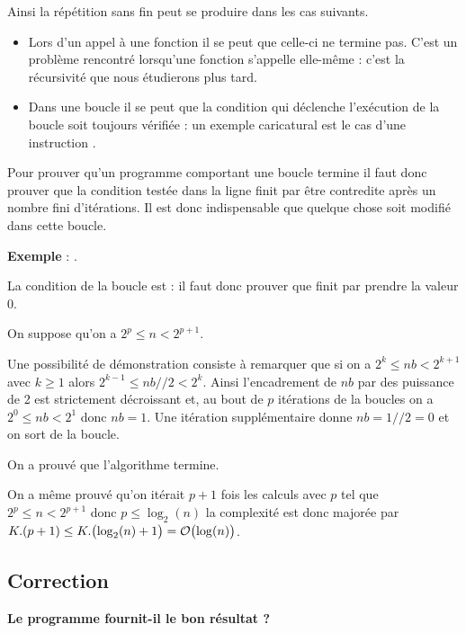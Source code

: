 Ainsi la répétition sans fin peut se produire dans les cas suivants.
\begin{itemize}
\item Lors d'un appel à une fonction il se peut que celle-ci ne termine pas. C'est un problème rencontré lorsqu'une fonction s'appelle elle-même : c'est la récursivité que nous étudierons plus tard.
\item Dans une boucle  il se peut que la condition qui déclenche l'exécution de la boucle soit toujours vérifiée : un exemple caricatural est le cas d'une instruction .
\end{itemize}
Pour prouver qu'un programme comportant une boucle  termine il faut donc prouver que la condition testée dans la ligne  finit par être contredite après un nombre fini d'itérations. Il est donc indispensable que quelque chose soit modifié dans cette boucle.

\medskip

{\bf Exemple}  : .

La condition de la boucle  est  : il faut donc prouver que  finit par prendre la valeur 0.

On suppose qu'on a $2^p \le n < 2^{p+1}$.

Une possibilité de démonstration consiste à remarquer que si on a $2^k\le nb < 2^{k+1}$ avec $k\ge 1$ alors $2^{k-1}\le nb//2 < 2^k$. Ainsi l'encadrement de $nb$ par des puissance de 2 est strictement décroissant et, au bout de $p$ itérations de la boucles on a $2^0 \le nb < 2^1$ donc $nb=1$. Une itération supplémentaire donne $nb = 1//2 = 0$ et on sort de la boucle. 

On a prouvé que l'algorithme termine.

On a même prouvé qu'on itérait $p+1$ fois les calculs avec $p$ tel que $2^p \le n < 2^{p+1}$ donc $p\le \log_2(n)$ la complexité est donc majorée par $K.(p+1) \le K.\bigl(\log_2(n)+1\bigr)={\cal O}\bigl(\log(n)\bigr)$.
\newpage
\subsection{Correction}
{\bf Le programme fournit-il le bon résultat ?}


